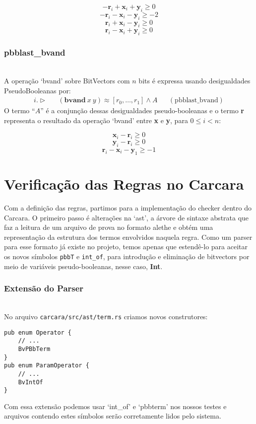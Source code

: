 \documentclass[conference]{IEEEtran}
\begin{document}
\[ -\textbf{r}_i+\textbf{x}_i+\textbf{y}_i\ge 0 \]
\[ -\textbf{r}_i-\textbf{x}_i-\textbf{y}_i\ge -2 \]
\[ \textbf{r}_i+\textbf{x}_i-\textbf{y}_i\ge 0 \]
\[ \textbf{r}_i-\textbf{x}_i+\textbf{y}_i\ge 0 \]

\subsubsection{\textbf{pbblast\_bvand}}
\noindent\\
A operação `bvand' sobre BitVectors com $n$ bits é expressa usando desigualdades PseudoBooleanas por:
\begin{align*}
    i. \vartriangleright &  & (\textbf{bvand}\ x\ y) \approx [r_0,\dots,r_1] \land A &  & (\text{pbblast\_bvand})
\end{align*}
O termo ``$A$'' é a conjunção dessas desigualdades pseudo-booleanas e o termo \textbf{r} representa
o resultado da operação `bvand' entre \textbf{x} e \textbf{y}, para $0 \le i < n$:

\[ \textbf{x}_i-\textbf{r}_i\ge 0 \]
\[ \textbf{y}_i-\textbf{r}_i\ge 0 \]
\[ \textbf{r}_i-\textbf{x}_i-\textbf{y}_1\ge -1 \]

\section{Verificação das Regras no Carcara}
Com a definição das regras, partimos para a implementação do checker dentro do Carcara.
O primeiro passo é alterações na `ast', a árvore de sintaxe abstrata que faz a leitura de um
arquivo de prova no formato alethe e obtém uma representação da estrutura dos termos envolvidos
naquela regra. Como um parser para esse formato já existe no projeto, temos apenas que estendê-lo
para aceitar os novos símbolos \texttt{pbbT} e \texttt{int\_of}, para introdução e eliminação de
bitvectors por meio de variáveis pseudo-booleanas, nesse caso, \textbf{Int}.

\subsubsection{Extensão do Parser}
\noindent\\
No arquivo \texttt{carcara/src/ast/term.rs} criamos novos construtores:

\begin{verbatim}
pub enum Operator {
    // ...
    BvPBbTerm
}
pub enum ParamOperator {
    // ...
    BvIntOf
}
\end{verbatim}
Com essa extensão podemos usar `int\_of' e `pbbterm' nos nossos testes e arquivos contendo
estes símbolos serão corretamente lidos pelo sistema.
\end{document}
